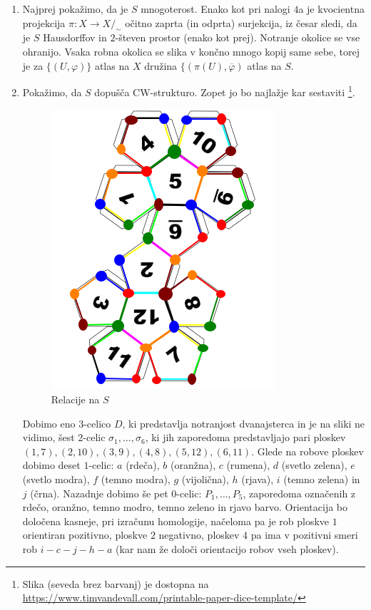\documentclass[a4paper, 12pt]{article}
\begin{document}
\begin{enumerate}[label=(\alph*)]
	\item Najprej pokažimo, da je $S$ mnogoterost. Enako kot pri nalogi $4$a je kvocientna projekcija $\pi \colon X \to X/_\sim$ očitno zaprta (in odprta) surjekcija, iz česar sledi, da je $S$ Hausdorffov in $2$-števen prostor (enako kot prej). Notranje okolice se vse ohranijo. Vsaka robna okolica se slika v končno mnogo kopij same sebe, torej je za $\lbrace (U, \varphi) \rbrace$ atlas na $X$ družina $\lbrace (\pi(U), \overline{\varphi})$ atlas na $S$.
	\item Pokažimo, da $S$ dopušča CW-strukturo. Zopet jo bo najlažje kar sestaviti \footnote{Slika (seveda brez barvanj) je dostopna na \url{https://www.timvandevall.com/printable-paper-dice-template/}}.
	\begin{figure}[h]
		\centering
		\includegraphics[scale=0.6]{cw5b.png}
		\caption{Relacije na $S$}
		\label{fig:cw5}
	\end{figure}
	
	Dobimo eno $3$-celico $D$, ki predstavlja notranjost dvanajsterca in je na sliki ne vidimo, šest $2$-celic $\sigma_1, \dots, \sigma_6$, ki jih zaporedoma predstavljajo pari ploskev $(1, 7), (2, 10), (3, 9), (4, 8), (5, 12), (6, 11)$. Glede na robove ploskev dobimo deset $1$-celic: $a$ (rdeča), $b$ (oranžna), $c$ (rumena), $d$ (svetlo zelena), $e$ (svetlo modra), $f$ (temno modra), $g$ (vijolična), $h$ (rjava), $i$ (temno zelena) in $j$ (črna). Nazadnje dobimo še pet $0$-celic: $P_1, \dots, P_5$, zaporedoma označenih z rdečo, oranžno, temno modro, temno zeleno in rjavo barvo. Orientacija bo določena kasneje, pri izračunu homologije, načeloma pa je rob ploskve $1$ orientiran pozitivno, ploskve $2$ negativno, ploskev $4$ pa ima v pozitivni smeri rob $i - c - j - h - a$ (kar nam že določi orientacijo robov vseh ploskev).
	

\end{enumerate}
\end{document}
